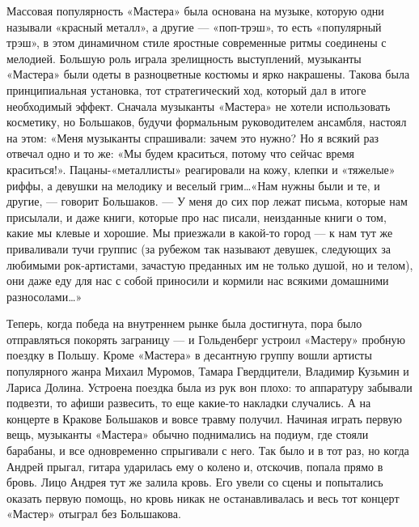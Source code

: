 \documentclass[16pt,a5paper,oneside]{book}
\begin{document}
Массовая популярность «Мастера» была основана на музыке, которую одни называли «красный металл», а другие — «поп-трэш»,
то есть «популярный трэш», в этом динамичном стиле яростные современные ритмы соединены с мелодией. Большую роль играла
зрелищность выступлений, музыканты «Мастера» были одеты в разноцветные костюмы и ярко накрашены. Такова была
принципиальная установка, тот стратегический ход, который дал в итоге необходимый эффект. Сначала музыканты «Мастера» не
хотели использовать косметику, но Большаков, будучи формальным руководителем ансамбля, настоял на этом: «Меня музыканты
спрашивали: зачем это нужно? Но я всякий раз отвечал одно и то же: «Мы будем краситься, потому что сейчас время
краситься!». Пацаны-«металлисты» реагировали на кожу, клепки и «тяжелые» риффы, а девушки на мелодику и веселый
грим\ldots «Нам нужны были и те, и другие, — говорит Большаков. — У меня до сих пор лежат письма, которые нам присылали,
и даже книги, которые про нас писали, неизданные книги о том, какие мы клевые и хорошие. Мы приезжали в какой-то город —
к нам тут же приваливали тучи группис (за рубежом так называют девушек, следующих за любимыми рок-артистами, зачастую
преданных им не только душой, но и телом), они даже еду для нас с собой приносили и кормили нас всякими домашними
разносолами\ldots»

Теперь, когда победа на внутреннем рынке была достигнута, пора было отправляться покорять заграницу — и Гольденберг
устроил «Мастеру» пробную поездку в Польшу. Кроме «Мастера» в десантную группу вошли артисты популярного жанра Михаил
Муромов, Тамара Гвердцители, Владимир Кузьмин и Лариса Долина. Устроена поездка была из рук вон плохо: то аппаратуру
забывали подвезти, то афиши развесить, то еще какие-то накладки случались. А на концерте в Кракове Большаков и вовсе
травму получил. Начиная играть первую вещь, музыканты «Мастера» обычно поднимались на подиум, где стояли барабаны, и все
одновременно спрыгивали с него. Так было и в тот раз, но когда Андрей прыгал, гитара ударилась ему о колено и, отскочив,
попала прямо в бровь. Лицо Андрея тут же залила кровь. Его увели со сцены и попытались оказать первую помощь, но кровь
никак не останавливалась и весь тот концерт «Мастер» отыграл без Большакова.
\end{document}
